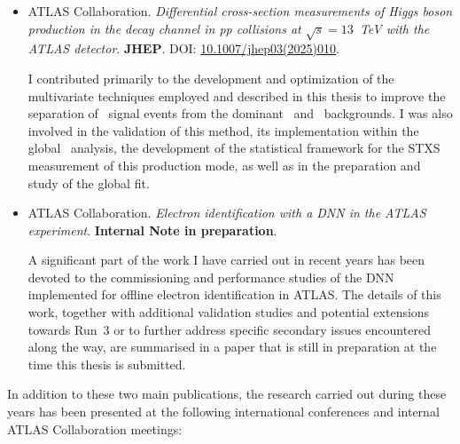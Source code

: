 \begin{itemize}
\item ATLAS Collaboration. \textit{Differential cross-section measurements of Higgs boson production in the \htautau decay channel in pp collisions at $\sqrt{s}=13$~TeV with the ATLAS detector}.
\textbf{JHEP}. DOI: \href{https://link.springer.com/article/10.1007/JHEP03(2025)010}{10.1007/jhep03(2025)010}.

I contributed primarily to the development and optimization of the multivariate techniques employed and described in this thesis to improve the separation of \ttHtt\ signal events from the dominant \ztautau\ and \ttbar\ backgrounds. I was also involved in the validation of this method, its implementation within the global \htautau\ analysis, the development of the statistical framework for the STXS measurement of this production mode, as well as in the preparation and study of the global fit.

\item ATLAS Collaboration. \textit{Electron identification with a DNN in the ATLAS experiment}.
\textbf{Internal Note in preparation}.

A significant part of the work I have carried out in recent years has been devoted to the commissioning and performance studies of the DNN implemented for offline electron identification in ATLAS. The details of this work, together with additional validation studies and potential extensions towards Run~3 or to further address specific secondary issues encountered along the way, are summarised in a paper that is still in preparation at the time this thesis is submitted.

\end{itemize}

In addition to these two main publications, the research carried out during these years has been presented at the following international conferences and internal ATLAS Collaboration meetings:

